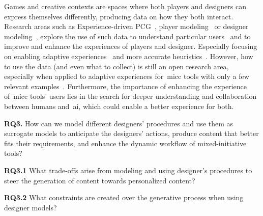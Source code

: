 Games and creative contexts are spaces where both players and designers can express themselves differently, producing data on how they both interact. Research areas such as Experience-driven PCG~\cite{Yannakakis2011-experiencedrivenPCG}, player modeling~\cite{Pedersen2010-modelingPlayerExp,Holmgard2019-proceduralPersonas} or designer modeling~\cite{Liapis2013-designerModel}, explore the use of such data to understand particular users~\cite{Liapis2013-designerModel,Drachen2009-playerModellingTombRaider,Melhart2019-ModellingMotivation} and to improve and enhance the experiences of players and designer. Especially focusing on enabling adaptive experiences~\cite{hastings_evolving_2009} and more accurate heuristics~\cite{Marinho2015-empiricalEvaluation,canossa2015-towardspcgEvaluation,summerville2017-understandingMario}. However, how to use the data (and even what to collect) is still an open research area, especially when applied to adaptive experiences for~\acrshort{micc} tools with only a few relevant examples~\cite{Liapis2014-designerModelImpl,Liapis2012-adaptiveVisual}. Furthermore, the importance of enhancing the experience of~\acrshort{micc} tools' users lies in the search for deeper understanding and collaboration between humans and~\acrshort{ai}, which could enable a better experience for both.

\begin{retQuestion}{}
   \textbf{RQ3.} How can we model different designers' procedures and use them as surrogate models to anticipate the designers' actions, produce content that better fits their requirements, and enhance the dynamic workflow of mixed-initiative tools? 
   
    \begin{retQuestion}{}
        \textbf{RQ3.1} What trade-offs arise from modeling and using designer's procedures to steer the generation of content towards personalized content?
    \end{retQuestion}
   
   \begin{retQuestion}{}
        \textbf{RQ3.2} What constraints are created over the generative process when using designer models?
    \end{retQuestion}
   
\end{retQuestion}

